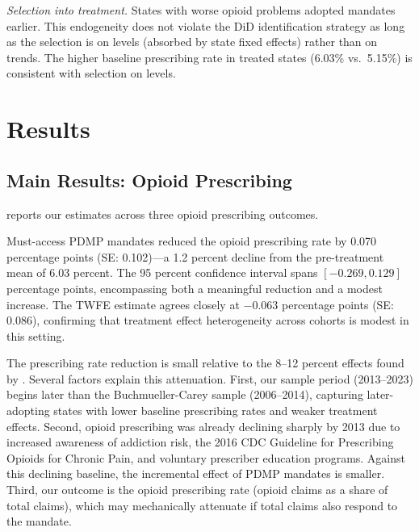 \documentclass[12pt]{article}
\begin{document}
\textit{Selection into treatment.} States with worse opioid problems adopted mandates earlier. This endogeneity does not violate the DiD identification strategy as long as the selection is on levels (absorbed by state fixed effects) rather than on trends. The higher baseline prescribing rate in treated states (6.03\% vs.\ 5.15\%) is consistent with selection on levels.


\section{Results}\label{sec:results}

\subsection{Main Results: Opioid Prescribing}\label{sec:results_main}

 reports our estimates across three opioid prescribing outcomes.



Must-access PDMP mandates reduced the opioid prescribing rate by 0.070 percentage points (SE: 0.102)---a 1.2 percent decline from the pre-treatment mean of 6.03 percent. The 95 percent confidence interval spans $[-0.269, 0.129]$ percentage points, encompassing both a meaningful reduction and a modest increase. The TWFE estimate agrees closely at $-0.063$ percentage points (SE: 0.086), confirming that treatment effect heterogeneity across cohorts is modest in this setting.

The prescribing rate reduction is small relative to the 8--12 percent effects found by \citet{buchmueller2018effect}. Several factors explain this attenuation. First, our sample period (2013--2023) begins later than the Buchmueller-Carey sample (2006--2014), capturing later-adopting states with lower baseline prescribing rates and weaker treatment effects. Second, opioid prescribing was already declining sharply by 2013 due to increased awareness of addiction risk, the 2016 CDC Guideline for Prescribing Opioids for Chronic Pain, and voluntary prescriber education programs. Against this declining baseline, the incremental effect of PDMP mandates is smaller. Third, our outcome is the opioid prescribing rate (opioid claims as a share of total claims), which may mechanically attenuate if total claims also respond to the mandate.
\end{document}
